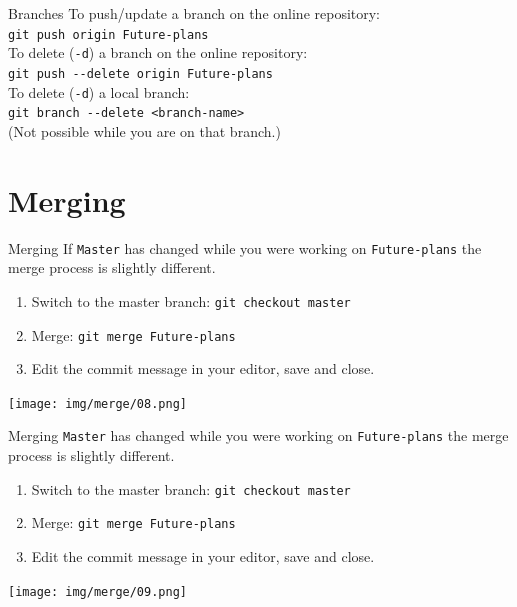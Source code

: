 \documentclass[usenames,dvipsnames,9pt]{beamer}
\begin{document}
%
\begin{frame}{Branches}
  \centering
  To push/update a branch on the online repository:\\
  \lstinline|git push origin Future-plans|\\
  \vspace{1cm}
  To delete (\lstinline|-d|) a branch on the online repository:\\
  \lstinline|git push --delete origin Future-plans|\\
  \vspace{1cm}
  To delete (\lstinline|-d|) a local branch:\\
  \lstinline|git branch --delete <branch-name>|\\
  (Not possible while you are on that branch.)
\end{frame}



%
%
\section{Merging}

%
\begin{frame}{Merging}
  If \texttt{Master} has changed while you were working on \texttt{Future-plans} the merge process is slightly different.
  \begin{enumerate}
    \item Switch to the master branch: \lstinline|git checkout master|
    \item Merge: \lstinline|git merge Future-plans|
    \item Edit the commit message in your editor, save and close.
  \end{enumerate}
  \texttt{[image: img/merge/08.png]}
\end{frame}

%
\begin{frame}{Merging}
  \texttt{Master} has changed while you were working on \texttt{Future-plans} the merge process is slightly different.
  \begin{enumerate}
    \item Switch to the master branch: \lstinline|git checkout master|
    \item Merge: \lstinline|git merge Future-plans|
    \item Edit the commit message in your editor, save and close.
  \end{enumerate}
  \texttt{[image: img/merge/09.png]}
\end{frame}
\end{document}
